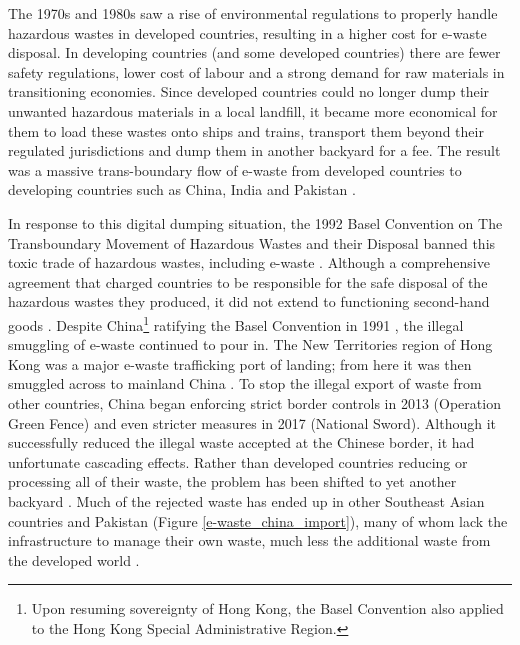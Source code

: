 \documentclass{article}
\begin{document}
The 1970s and 1980s saw a rise of environmental regulations to properly handle hazardous wastes in developed countries, resulting in a higher cost for e-waste disposal. In developing countries (and some developed countries) there are fewer safety regulations, lower cost of labour and a strong demand for raw materials in transitioning economies. Since developed countries could no longer dump their unwanted hazardous materials in a local landfill, it became more economical for them to load these wastes onto ships and trains, transport them beyond their regulated jurisdictions and dump them in another backyard for a fee. The result was a massive trans-boundary flow of e-waste from developed countries to developing countries such as China, India and Pakistan  \cite{sthiannopkao2013handling, zhang2012waste}.

In response to this digital dumping situation, the 1992 Basel Convention on The Transboundary Movement of Hazardous Wastes and their Disposal banned this toxic trade of hazardous wastes, including e-waste \cite{baselconvention2011}. Although a comprehensive agreement that charged countries to be responsible for the safe disposal of the hazardous wastes they produced, it did not extend to functioning second-hand goods \cite{sthiannopkao2013handling}. Despite China\footnote{Upon resuming sovereignty of Hong Kong, the Basel Convention also applied to the Hong Kong Special Administrative Region.} ratifying the Basel Convention in 1991 \cite{baselconvention2011ratify}, the illegal smuggling of e-waste continued to pour in. The New Territories region of Hong Kong was a major e-waste trafficking port of landing; from here it was then smuggled across to mainland China \cite{ban2018carecyclingexport}. To stop the illegal export of waste from other countries, China began enforcing strict border controls in 2013 (Operation Green Fence) and even stricter measures in 2017 (National Sword). Although it successfully reduced the illegal waste accepted at the Chinese border, it had unfortunate cascading effects. Rather than developed countries reducing or processing all of their waste, the problem has been shifted to yet another backyard \cite{financialtimes2018nationalsword}. Much of the rejected waste has ended up in other Southeast Asian countries and Pakistan (Figure \ref{e-waste_china_import}), many of whom lack the infrastructure to manage their own waste, much less the additional waste from the developed world \cite{ban2018carecyclingexport, brooks2018chinese}.
\end{document}
